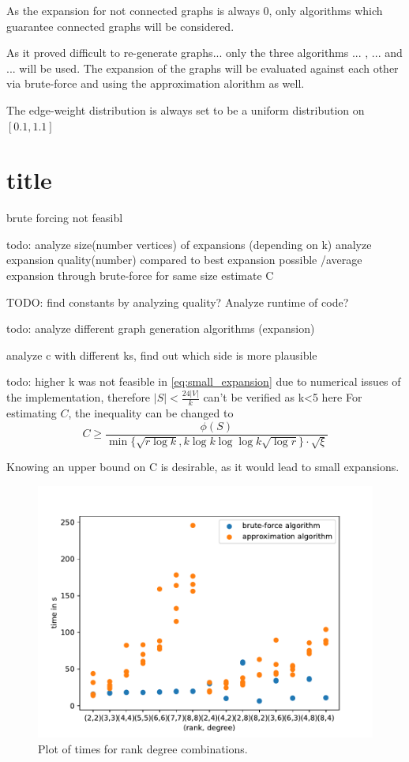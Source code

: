 As the expansion for not connected graphs is always 0, only algorithms which guarantee connected graphs will be considered.

As it proved difficult to re-generate graphs... only the three algorithms ... , ... and ... will be used. The expansion of the graphs will be evaluated against each other via brute-force and using the approximation alorithm as well.


The edge-weight distribution is always set to be a uniform distribution on $[0.1, 1.1]$
\section{title}

brute forcing not feasibl

todo: analyze size(number vertices) of expansions (depending on k)
analyze expansion quality(number) compared to best expansion possible /average expansion through brute-force for same size
estimate C



TODO: find constants by analyzing quality?
Analyze runtime of code? 

todo: analyze different graph generation algorithms (expansion)

analyze c with different ks, find out which side is more plausible


todo: higher k was not feasible in \cref{eq:small_expansion} due to numerical issues of the implementation, therefore $|S|<\frac{24|V|}{k}$ can't be verified as k<5 here
For estimating $C$, the inequality can be changed to
\begin{equation} \label{eq:c_estimate}
 C\ge \frac {\phi(S)}{ \min\{\sqrt{r \log k}, k \log k  \log \log k \sqrt{\log r} \} \cdot \sqrt{\xi}}
\end{equation}

Knowing an upper bound on C is desirable, as it would lead to small expansions.


\begin{figure}
	\centering
	\includegraphics[scale=1]{figures/rank_degree_combinations_all_logs.pdf}
	\caption[Plot times rank degree combinations]{Plot of times for rank degree combinations.}
\end{figure}


